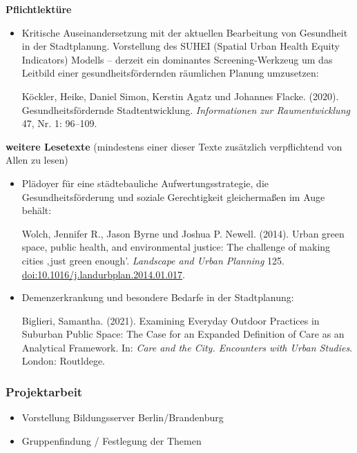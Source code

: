 \documentclass[
  ngerman,
]{article}
\providecommand{\tightlist}{%
  \setlength{\itemsep}{0pt}\setlength{\parskip}{0pt}}
\begin{document}
\textbf{Pflichtlektüre}

\begin{itemize}
\item
  Kritische Auseinandersetzung mit der aktuellen Bearbeitung von Gesundheit in der Stadtplanung. Vorstellung des SUHEI (Spatial Urban Health Equity Indicators) Modells -- derzeit ein dominantes Screening-Werkzeug um das Leitbild einer gesundheitsfördernden räumlichen Planung umzusetzen:

  Köckler, Heike, Daniel Simon, Kerstin Agatz und Johannes Flacke. (2020). Gesundheitsfördernde Stadtentwicklung. \emph{Informationen zur Raumentwicklung} 47, Nr. 1: 96--109.
\end{itemize}

\textbf{weitere Lesetexte}
(mindestens einer dieser Texte zusätzlich verpflichtend von Allen zu lesen)

\begin{itemize}
\item
  Plädoyer für eine städtebauliche Aufwertungsstrategie, die Gesundheitsförderung und soziale Gerechtigkeit gleichermaßen im Auge behält:

  Wolch, Jennifer R., Jason Byrne und Joshua P. Newell. (2014). Urban green space, public health, and environmental justice: The challenge of making cities ‚just green enough'. \emph{Landscape and Urban Planning} 125. \url{doi:10.1016/j.landurbplan.2014.01.017}.
\item
  Demenzerkrankung und besondere Bedarfe in der Stadtplanung:

  Biglieri, Samantha. (2021). Examining Everyday Outdoor Practices in Suburban Public Space: The Case for an Expanded Definition of Care as an Analytical Framework. In: \emph{Care and the City. Encounters with Urban Studies}. London: Routldege.
\end{itemize}

\hypertarget{projektarbeit-1}{%
\subsubsection*{Projektarbeit}\label{projektarbeit-1}}

\begin{itemize}
\tightlist
\item
  Vorstellung Bildungsserver Berlin/Brandenburg
\item
  Gruppenfindung / Festlegung der Themen
\end{itemize}
\end{document}
